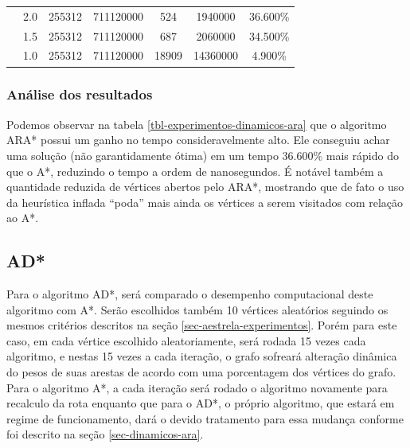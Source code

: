 \begin{table}[H]
\begin{adjustbox}{max width=\textwidth}
\begin{tabular}{|c|c|c|c|c|c|c|}
                                   & 2.0                                     & 255312                               & 711120000                                    & 524                                    & 1940000                                        & 36.600\%                                                       \\ \cline{2-7} 
                                   & 1.5                                     & 255312                               & 711120000                                    & 687                                    & 2060000                                        & 34.500\%                                                       \\ \cline{2-7} 
                                   & 1.0                                     & 255312                               & 711120000                                    & 18909                                  & 14360000                                       & 4.900\%                                                        \\ \hline
\end{tabular}
\end{adjustbox}
\end{table}

\subsubsection{Análise dos resultados}
\label{sec-experimentos-dinamicos-ara-analise}

Podemos observar na tabela \ref{tbl-experimentos-dinamicos-ara} que o algoritmo ARA* possui um ganho no tempo consideravelmente alto. Ele conseguiu achar uma solução (não garantidamente ótima) em um tempo 36.600\% mais rápido do que o A*, reduzindo o tempo a ordem de nanosegundos. É notável também a quantidade reduzida de vértices abertos pelo ARA*, mostrando que de fato o uso da heurística inflada ``poda'' mais ainda os vértices a serem visitados com relação ao A*.

\subsection{AD*}
\label{sec-experimentos-dinamicos-ad}

Para o algoritmo AD*, será comparado o desempenho computacional deste algoritmo com A*. Serão escolhidos também 10 vértices aleatórios seguindo os mesmos critérios descritos na seção \ref{sec-aestrela-experimentos}. Porém para este caso, em cada vértice escolhido aleatoriamente, será rodada 15 vezes cada algoritmo, e nestas 15 vezes a cada iteração, o grafo sofreará alteração dinâmica do pesos de suas arestas de acordo com uma porcentagem dos vértices do grafo. Para o algoritmo A*, a cada iteração será rodado o algoritmo novamente para recalculo da rota enquanto que para o AD*, o próprio algoritmo, que estará em regime de funcionamento, dará o devido tratamento para essa mudança conforme foi descrito na seção \ref{sec-dinamicos-ara}.


